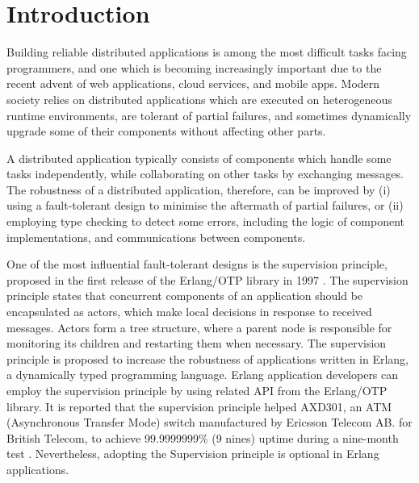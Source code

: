 \chapter{Introduction}



Building reliable distributed applications is among the most difficult tasks 
facing programmers, and one which is becoming increasingly important due to the 
recent advent of web applications, cloud services, and mobile apps.  Modern 
society relies on distributed applications which are executed on heterogeneous 
runtime environments, are tolerant of partial failures, and sometimes 
dynamically upgrade some of their components without affecting other parts.

A distributed application typically consists of components which handle some 
tasks independently, while collaborating on other tasks by exchanging
messages.  The robustness of a distributed application, therefore, 
can be improved by (i) using a fault-tolerant design to minimise the 
aftermath of partial failures, or (ii) employing type checking to detect 
some errors, including the logic of component implementations, and 
communications between components.

One of the most influential fault-tolerant designs is the supervision 
principle, proposed in the first release of the Erlang/OTP library in 1997 
\citep{OTP}. The supervision principle states that concurrent components of an 
application should be encapsulated as actors, which make local decisions in 
response to received messages.  Actors form a tree structure, where a parent 
node is responsible for monitoring its children and restarting them when 
necessary. The supervision principle is proposed to increase the robustness of 
applications written in Erlang, a dynamically typed programming language.  
Erlang application developers can employ the supervision principle by using 
related API from the Erlang/OTP library.  It is reported that the supervision 
principle helped AXD301, an ATM (Asynchronous Transfer Mode) switch 
manufactured by Ericsson Telecom AB. for British Telecom, to achieve 
99.9999999\% (9 nines) uptime during a nine-month test \citep{ArmstrongAXD}. 
Nevertheless, adopting the Supervision principle is optional in Erlang 
applications.

